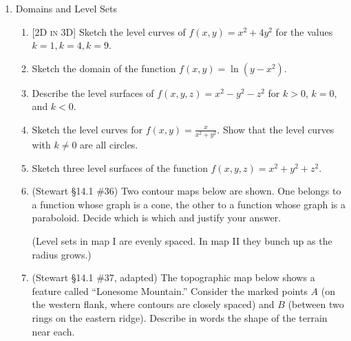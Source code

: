 \documentclass[12pt]{article}
\newcommand{\dimtag}[1]{{\footnotesize\textsc{[#1]}}\;}
\newcounter{topic}
\begin{document}
\begin{enumerate}\setcounter{enumi}{\value{topic}}

\item Domains and Level Sets
    \begin{enumerate}
        \item \dimtag{2D in 3D} Sketch the level curves of $f(x,y) = x^2 + 4y^2$ for the values $k=1, k=4, k=9$.
        \item Sketch the domain of the function $f(x,y) = \ln(y - x^2)$.
        \item Describe the level surfaces of $f(x,y,z) = x^2 - y^2 - z^2$ for $k > 0$, $k = 0$, and $k < 0$.
        \item Sketch the level curves for $f(x,y) = \frac{x}{x^2 + y^2}$. Show that the level curves with $k \neq 0$ are all circles.
        \item Sketch three level surfaces of the function $f(x,y,z) = x^2 + y^2 + z^2$.
        \item (Stewart \S14.1 \#36) Two contour maps below are shown. One belongs to a function whose graph is a cone, the other to a function whose graph is a paraboloid. Decide which is which and justify your answer.
        \begin{center}
        \hspace{1.5cm}%
        \end{center}
        (Level sets in map I are evenly spaced. In map II they bunch up as the radius grows.)
        \item (Stewart \S14.1 \#37, adapted) The topographic map below shows a feature called ``Lonesome Mountain.'' Consider the marked points $A$ (on the western flank, where contours are closely spaced) and $B$ (between two rings on the eastern ridge). Describe in words the shape of the terrain near each.

\end{enumerate}
\end{enumerate}
\end{document}

